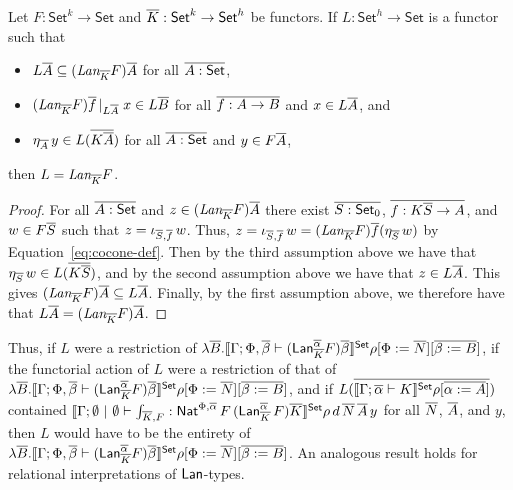 \documentclass{lmcs}
\theoremstyle{plain}\newtheorem{satz}[thm]{Satz}
\newcommand{\set}{\mathsf{Set}}
\begin{document}
{\begin{prop}\label{prop:full-lan}
Let $F : \set^k \to \set$ and $\ol K : \set^k \to \set^h$ be functors.
If $L : \set^h \to \set$ is a functor such that 
\begin{itemize}
\item $L \overline{A} \subseteq
  (\textit{Lan}_{\overline{K}} F)\overline{A}$ for all $\ol{A : \set}$,
\item $(\textit{Lan}_{\overline{K}} F)\overline{f}\,|_{L \overline{A}}\; x \in L
  \overline{B}$ for all $\overline{f : A \to B}$ and $x \in L \overline{A}$, and 
\item $\eta_{\overline{A}}\, y \in L ( \overline{K \overline{A}} )$ for all $\ol{A :
  \set}$ and $y \in F \overline{A}$, 
\end{itemize}
then $L = \textit{Lan}_{\overline{K}} F$.
\end{prop}
\begin{proof}
For all $\ol{A : \set}$ and $z \in (\textit{Lan}_{\overline{K}} F)\overline{A}$
there exist $\ol{S : \set_0}$, $\overline{f : K \overline{S} \to A}$, and $w \in F
\overline{S}$ such that $z = \iota_{\overline{S}, \overline{f}}\, w$.  Thus, $z =
\iota_{\overline{S}, \overline{f}}\, w = (\textit{Lan}_{\overline{K}} F) \overline{f}
(\eta_{\overline{S}} \,w)$ by Equation~\ref{eq:cocone-def}. Then by the
third assumption above we have that $\eta_{\overline{S}}\, w \in L (\overline{K
  \overline{S}})$, and by the second assumption above we have that $z \in L
\overline{A}$. This gives $(\textit{Lan}_{\overline{K}} F)\overline{A} \subseteq L \overline{A}$. Finally, by the first assumption above, we therefore have that $L
\overline{A} = (\textit{Lan}_{\overline{K}} F)\overline{A}$.
\end{proof}
Thus, if $L$ were a restriction of $\lambda \ol B. \setsem{\Gamma; \Phi,\ol\beta
  \vdash (\Lan^{\ol\alpha}_{\ol K} F){\ol \beta}}\rho[\Phi := \ol
  N][\ol{\beta := B}]$,
if the functorial 
action of $L$ were a restriction of that of $\lambda \ol B. \setsem{\Gamma;
  \Phi,\ol\beta \vdash (\Lan^{\ol\alpha}_{\ol K} F){\ol
    \beta}}\rho[\Phi := \ol N][\ol{\beta := B}]$, and if
$L(\ol{\setsem{\Gamma;\ol\alpha \vdash K}\rho[\ol{\alpha := A}]})$ 
contained $\setsem{\Gamma;\emptyset~|~\emptyset \vdash \int_{\ol
    K,F} : \Nat^{\Phi, \ol\alpha}\, F\, (\Lan^{\ol\alpha}_{\ol{K}}\,
  F) \ol{K}}\rho\,d\,\ol N\,\ol A\,y$ for all $\overline{N}$, $\overline{A}$, and
$y$, then $L$ would have to be the entirety of
 $\lambda \ol B. \setsem{\Gamma; \Phi,\ol\beta
  \vdash (\Lan^{\ol\alpha}_{\ol K} F){\ol \beta}}\rho[\Phi := \ol
  N][\ol{\beta := B}]$.
An analogous result holds for relational
interpretations of $\mathsf{Lan}$-types.

}
\end{document}
